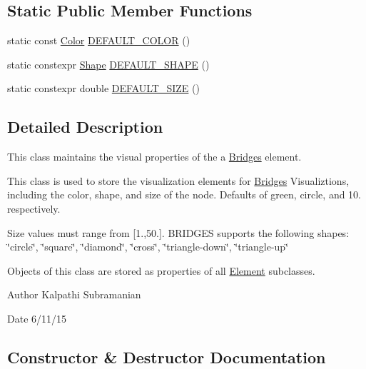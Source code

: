 \subsection*{Static Public Member Functions}
\begin{DoxyCompactItemize}
\item 
static const \hyperlink{classbridges_1_1_color}{Color} \hyperlink{classbridges_1_1_element_visualizer_af86eb415ef765943472952ba49f7163d}{D\+E\+F\+A\+U\+L\+T\+\_\+\+C\+O\+L\+O\+R} ()
\item 
static constexpr \hyperlink{namespacebridges_a1b4050586bd708782ae0d4f3b06b9579}{Shape} \hyperlink{classbridges_1_1_element_visualizer_a79c6eef0e43bdd61b9292053dfe45f29}{D\+E\+F\+A\+U\+L\+T\+\_\+\+S\+H\+A\+P\+E} ()
\item 
static constexpr double \hyperlink{classbridges_1_1_element_visualizer_a3e21ee8df1c6c3f22a8c631894344413}{D\+E\+F\+A\+U\+L\+T\+\_\+\+S\+I\+Z\+E} ()
\end{DoxyCompactItemize}


\subsection{Detailed Description}
This class maintains the visual properties of the a \hyperlink{classbridges_1_1_bridges}{Bridges} element. 

This class is used to store the visualization elements for \hyperlink{classbridges_1_1_bridges}{Bridges} Visualiztions, including the color, shape, and size of the node. Defaults of green, circle, and 10. respectively.

Size values must range from \mbox{[}1.,50.\mbox{]}. B\+R\+I\+D\+G\+E\+S supports the following shapes\+: \char`\"{}circle\char`\"{}, \char`\"{}square\char`\"{}, \char`\"{}diamond\char`\"{}, \char`\"{}cross\char`\"{}, \char`\"{}triangle-\/down\char`\"{}, \char`\"{}triangle-\/up\char`\"{}

Objects of this class are stored as properties of all \hyperlink{classbridges_1_1_element}{Element} subclasses.

\begin{DoxyAuthor}{Author}
Kalpathi Subramanian 
\end{DoxyAuthor}
\begin{DoxyDate}{Date}
6/11/15 
\end{DoxyDate}


\subsection{Constructor \& Destructor Documentation}
\hypertarget{classbridges_1_1_element_visualizer_addcc19a2f7fd51dcc7aebfdabb882886}{}
